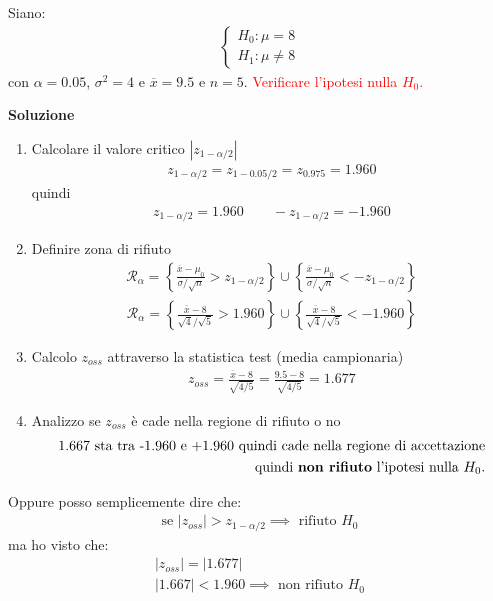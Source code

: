 \documentclass{article}  %
\theoremstyle{definition}
\begin{document}
\begin{esercizio}[Esercizio 3]
	Siano:
	\begin{align*}
		\begin{cases}
			H_0: \mu = 8 \\
			H_1: \mu \neq 8
		\end{cases}
	\end{align*}
	con $\alpha=0.05$, $\sigma^2=4$ e $\overline{x}=9.5$ e $n=5$. \textcolor{red}{Verificare l'ipotesi nulla $H_0$.}
	\begin{center}
		\textbf{Soluzione}
	\end{center}
	\begin{enumerate}
		\item Calcolare il valore critico $|z_{1-\alpha/2}|$
		      \begin{align*}
			      z_{1-\alpha/2}=z_{1-0.05/2}=z_{0.975}=1.960
		      \end{align*}
		      quindi
		      \begin{align*}
			      z_{1-\alpha/2}=1.960 \quad \quad -z_{1-\alpha/2}=-1.960
		      \end{align*}
		\item Definire zona di rifiuto
		      \begin{align*}
			      \mathcal{R}_{\alpha} = \left\{\frac{\overline{x}-\mu_0}{\sigma/\sqrt{n}} > z_{1-\alpha/2} \right\} \cup
			      \left\{\frac{\overline{x}-\mu_0}{\sigma/\sqrt{n}} < -z_{1-\alpha/2}\right\}
		      \end{align*}
		      \begin{align*}
			      \mathcal{R}_{\alpha} = \left\{\frac{\overline{x}-8}{\sqrt{4}/\sqrt{5}} > 1.960 \right\} \cup
			      \left\{\frac{\overline{x}-8}{\sqrt{4}/\sqrt{5}} < -1.960\right\}
		      \end{align*}
		\item Calcolo $z_{oss}$ attraverso la statistica test (media campionaria)
		      \begin{align*}
			      z_{oss} = \frac{\overline{x}-8}{\sqrt{4/5}} = \frac{9.5-8}{\sqrt{4/5}} = 1.677
		      \end{align*}
		\item Analizzo se $z_{oss}$ è cade nella regione di rifiuto o no
		      \begin{align*}
			      1.667 \text{ sta tra -1.960 e +1.960 quindi cade nella regione di accettazione} \\
			      \text{quindi \textbf{non rifiuto} l'ipotesi nulla } H_0.
		      \end{align*}
	\end{enumerate}
	Oppure posso semplicemente dire che:
	\begin{align*}
		\text{se } |z_{oss}| > z_{1- \alpha/2} \implies \text{ rifiuto } H_0
	\end{align*}
	ma ho visto che:
	\begin{align*}
		|z_{oss}| = |1.677| \\
		|1.667| < 1.960 \implies \text{ non rifiuto } H_0
	\end{align*}
\end{esercizio}
\end{document}

